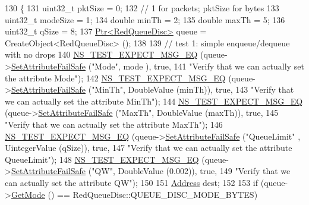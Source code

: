 \begin{DoxyCode}
130 \{
131   uint32\_t pktSize = 0;
132   \textcolor{comment}{// 1 for packets; pktSize for bytes}
133   uint32\_t modeSize = 1;
134   \textcolor{keywordtype}{double} minTh = 2;
135   \textcolor{keywordtype}{double} maxTh = 5;
136   uint32\_t qSize = 8;
137   \hyperlink{classns3_1_1Ptr}{Ptr<RedQueueDisc>} queue = CreateObject<RedQueueDisc> ();
138 
139   \textcolor{comment}{// test 1: simple enqueue/dequeue with no drops}
140   \hyperlink{group__testing_ga7304ba46a28d8cf08dfdfd6499cf7068}{NS\_TEST\_EXPECT\_MSG\_EQ} (queue->\hyperlink{classns3_1_1ObjectBase_aa7d333004e970f925a4ed5df275541b5}{SetAttributeFailSafe} (\textcolor{stringliteral}{"Mode"}, mode
      ), \textcolor{keyword}{true},
141                          \textcolor{stringliteral}{"Verify that we can actually set the attribute Mode"});
142   \hyperlink{group__testing_ga7304ba46a28d8cf08dfdfd6499cf7068}{NS\_TEST\_EXPECT\_MSG\_EQ} (queue->\hyperlink{classns3_1_1ObjectBase_aa7d333004e970f925a4ed5df275541b5}{SetAttributeFailSafe} (\textcolor{stringliteral}{"MinTh"}, 
      DoubleValue (minTh)), \textcolor{keyword}{true},
143                          \textcolor{stringliteral}{"Verify that we can actually set the attribute MinTh"});
144   \hyperlink{group__testing_ga7304ba46a28d8cf08dfdfd6499cf7068}{NS\_TEST\_EXPECT\_MSG\_EQ} (queue->\hyperlink{classns3_1_1ObjectBase_aa7d333004e970f925a4ed5df275541b5}{SetAttributeFailSafe} (\textcolor{stringliteral}{"MaxTh"}, 
      DoubleValue (maxTh)), \textcolor{keyword}{true},
145                          \textcolor{stringliteral}{"Verify that we can actually set the attribute MaxTh"});
146   \hyperlink{group__testing_ga7304ba46a28d8cf08dfdfd6499cf7068}{NS\_TEST\_EXPECT\_MSG\_EQ} (queue->\hyperlink{classns3_1_1ObjectBase_aa7d333004e970f925a4ed5df275541b5}{SetAttributeFailSafe} (\textcolor{stringliteral}{"QueueLimit"}
      , UintegerValue (qSize)), \textcolor{keyword}{true},
147                          \textcolor{stringliteral}{"Verify that we can actually set the attribute QueueLimit"});
148   \hyperlink{group__testing_ga7304ba46a28d8cf08dfdfd6499cf7068}{NS\_TEST\_EXPECT\_MSG\_EQ} (queue->\hyperlink{classns3_1_1ObjectBase_aa7d333004e970f925a4ed5df275541b5}{SetAttributeFailSafe} (\textcolor{stringliteral}{"QW"}, 
      DoubleValue (0.002)), \textcolor{keyword}{true},
149                          \textcolor{stringliteral}{"Verify that we can actually set the attribute QW"});
150 
151   \hyperlink{classns3_1_1Address}{Address} dest;
152   
153   \textcolor{keywordflow}{if} (queue->\hyperlink{classns3_1_1RedQueueDisc_af1064caa1eee00041ebfb43bc6e25abc}{GetMode} () == RedQueueDisc::QUEUE\_DISC\_MODE\_BYTES)

\end{DoxyCode}
